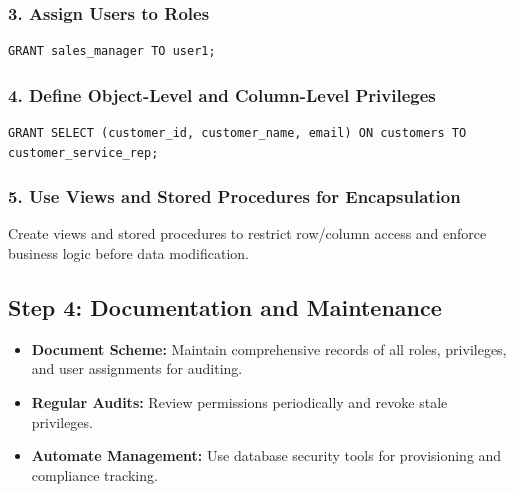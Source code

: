 \documentclass[12pt,a4paper]{article}
\begin{document}
\subsubsection*{3. Assign Users to Roles}
\begin{verbatim}
GRANT sales_manager TO user1;
\end{verbatim}

\subsubsection*{4. Define Object-Level and Column-Level Privileges}
\begin{verbatim}
GRANT SELECT (customer_id, customer_name, email) ON customers TO customer_service_rep;
\end{verbatim}

\subsubsection*{5. Use Views and Stored Procedures for Encapsulation}
Create views and stored procedures to restrict row/column access and enforce business logic before data modification.

\subsection{Step 4: Documentation and Maintenance}
\begin{itemize}
    \item \textbf{Document Scheme:} Maintain comprehensive records of all roles, privileges, and user assignments for auditing.
    \item \textbf{Regular Audits:} Review permissions periodically and revoke stale privileges.
    \item \textbf{Automate Management:} Use database security tools for provisioning and compliance tracking.
\end{itemize}
\end{document}
